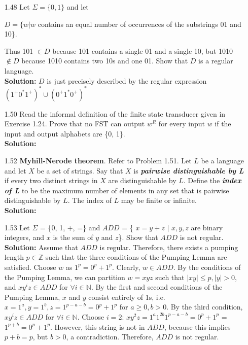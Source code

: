 \begin{enumerate}
\item[1.48]Let $\Sigma = \{0, 1\}$ and let
\begin{center}
$D = \{w | w$ contains an equal number of occurrences of the substrings 01 and 10\}.
\end{center}
Thus 101 $\in D$ because 101 contains a single 01 and a single 10, but 1010 $\notin D$ because 1010 contains two 10s and one 01. Show that $D$ is a regular language. 
\\
\textbf{Solution:} $D$ is just precisely described by the regular expression $(1^+0^*1^+)^* \cup (0^+1^*0^+)^*$

\item[1.50]Read the informal definition of the finite state transducer given in Exercise 1.24. Prove that no FST can output $w^R$ for every input $w$ if the input and output alphabets are \{0, 1\}.
\\
\textbf{Solution:} \alreadyanswered

\item[1.52]\textbf{Myhill-Nerode theorem}. Refer to Problem 1.51. Let $L$ be a language and let $X$ be a set of strings. Say that $X$ is \textbf{\emph{pairwise distinguishable by L}} if every two distinct strings in $X$ are distinguishable by $L$. Define the \textbf{\emph{index of L}} to be the maximum number of elements in any set that is pairwise distinguishable by $L$. The index of $L$ may be finite or infinite.
\\
\textbf{Solution:} \alreadyanswered

\item[1.53]Let $\Sigma$ = \{0, 1, +, =\} and $ADD$ = \{ $x = y + z$ $|$ $x, y, z$ are binary integers, and $x$ is the sum of $y$ and $z$\}. Show that $ADD$ is not regular.
\\
\textbf{Solution:} Assume that $ADD$ is regular. Therefore, there exists a pumping length $p \in \mathbb{Z}$ such that the three conditions of the Pumping Lemma are satisfied. Choose $w$ as $1^p=0^p+1^p$. Clearly, $w \in ADD$. By the conditions of the Pumping Lemma, we can partition $w = xyz$ such that $|xy| \le p, |y| > 0$, and $xy^iz \in ADD$ for $\forall i \in \mathbb{N}$. By the first and second conditions of the Pumping Lemma, $x$ and $y$ consist entirely of 1s, i.e. $x = 1^a, y = 1^b, z = 1^{p-a-b}=0^p+1^p$ for $a \ge 0, b > 0$. By the third condition, $xy^iz \in ADD$ for $\forall i \in \mathbb{N}$. Choose $i=2$: $xy^2z = 1^a1^{2b}1^{p-a-b}=0^p+1^p$ = $1^{p+b}=0^p+1^p$. However, this string is not in $ADD$, because this implies $p+b = p$, but $b > 0$, a contradiction. Therefore, $ADD$ is not regular.


\end{enumerate}

